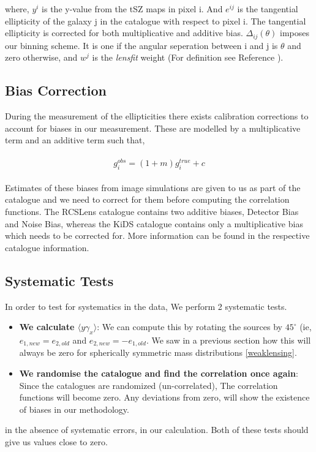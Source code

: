 where, $y^i$ is the y-value from the tSZ maps in pixel i. And $e^{ij}$ is the tangential ellipticity of the galaxy j in the catalogue with
respect to pixel i. The tangential ellipticity is corrected for both multiplicative and additive bias. $\Delta_{ij}(\theta)$ imposes our binning scheme.
It is one if the angular seperation between i and j is $\theta$ and zero otherwise, and $w^j$ is the \emph{lensfit} weight
(For definition see Reference \cite{weightdef}). 

\subsection{Bias Correction}
During the measurement of the ellipticities there exists calibration corrections to account for biases in our measurement. These are modelled by a
multiplicative term and an additive term such that,

\begin{align}
  \begin{split}
    g^{obs}_i = (1 + m)g^{true}_i + c
  \end{split}
\end{align}

Estimates of these biases from image simulations are given to us as part of the catalogue and we need to correct for them before computing the correlation
functions. The RCSLens catalogue contains two additive biases, Detector Bias and Noise Bias, whereas the KiDS catalogue contains only a multiplicative bias which
needs to be corrected for. More information can be found in the respective catalogue information. 



\subsection{Systematic Tests}
In order to test for systematics in the data, We perform 2 systematic tests.
\begin{itemize}
\item \textbf{We calculate $\langle y \gamma_x \rangle$}: We can compute this by rotating the sources by $45^\circ$ (ie, $e_{1,new} = e_{2,old}$ and
  $e_{2,new} = -e_{1,old}$. We saw in a previous section how this will always be zero for spherically symmetric mass distributions \ref{weaklensing}.

\item \textbf{We randomise the catalogue and find the correlation once again}: Since the catalogues are randomized (un-correlated),
  The correlation functions will become zero.
  Any deviations from zero, will show the existence of biases in our methodology.
\end{itemize}
in the absence of systematic errors, in our calculation. Both of these tests should give us values close to zero.

